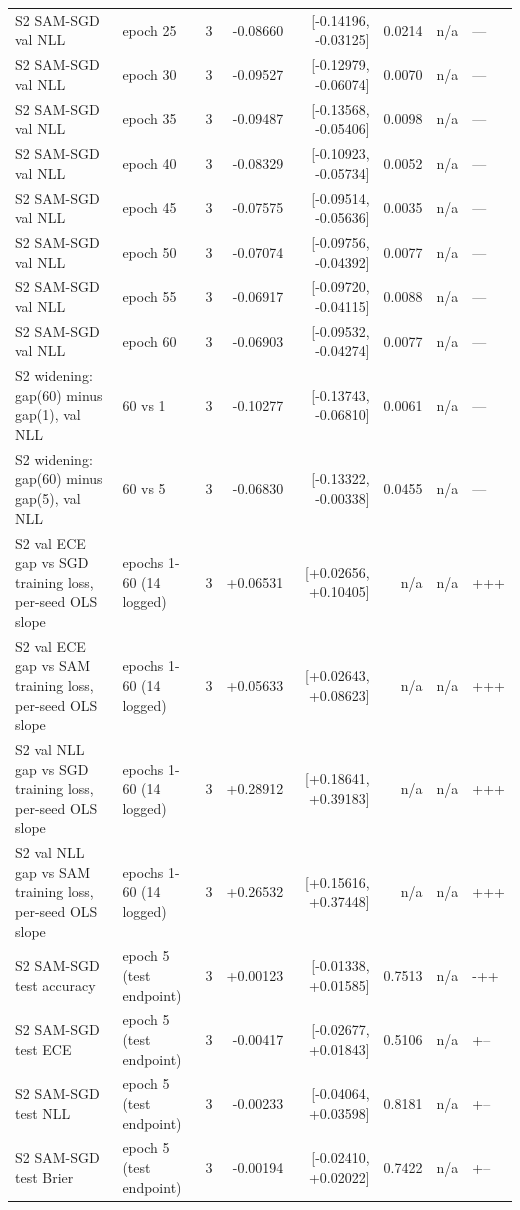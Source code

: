 \documentclass[11pt,letterpaper]{article}
\begin{document}
{\begin{longtable}{>{\raggedright\arraybackslash}p{3.6cm}lrrrrrl}
S2 SAM-SGD val NLL & epoch 25 & 3 & -0.08660 & [-0.14196, -0.03125] & 0.0214 & n/a & --- \\
S2 SAM-SGD val NLL & epoch 30 & 3 & -0.09527 & [-0.12979, -0.06074] & 0.0070 & n/a & --- \\
S2 SAM-SGD val NLL & epoch 35 & 3 & -0.09487 & [-0.13568, -0.05406] & 0.0098 & n/a & --- \\
S2 SAM-SGD val NLL & epoch 40 & 3 & -0.08329 & [-0.10923, -0.05734] & 0.0052 & n/a & --- \\
S2 SAM-SGD val NLL & epoch 45 & 3 & -0.07575 & [-0.09514, -0.05636] & 0.0035 & n/a & --- \\
S2 SAM-SGD val NLL & epoch 50 & 3 & -0.07074 & [-0.09756, -0.04392] & 0.0077 & n/a & --- \\
S2 SAM-SGD val NLL & epoch 55 & 3 & -0.06917 & [-0.09720, -0.04115] & 0.0088 & n/a & --- \\
S2 SAM-SGD val NLL & epoch 60 & 3 & -0.06903 & [-0.09532, -0.04274] & 0.0077 & n/a & --- \\
S2 widening: gap(60) minus gap(1), val NLL & 60 vs 1 & 3 & -0.10277 & [-0.13743, -0.06810] & 0.0061 & n/a & --- \\
S2 widening: gap(60) minus gap(5), val NLL & 60 vs 5 & 3 & -0.06830 & [-0.13322, -0.00338] & 0.0455 & n/a & --- \\
S2 val ECE gap vs SGD training loss, per-seed OLS slope & epochs 1-60 (14 logged) & 3 & +0.06531 & [+0.02656, +0.10405] & n/a & n/a & +++ \\
S2 val ECE gap vs SAM training loss, per-seed OLS slope & epochs 1-60 (14 logged) & 3 & +0.05633 & [+0.02643, +0.08623] & n/a & n/a & +++ \\
S2 val NLL gap vs SGD training loss, per-seed OLS slope & epochs 1-60 (14 logged) & 3 & +0.28912 & [+0.18641, +0.39183] & n/a & n/a & +++ \\
S2 val NLL gap vs SAM training loss, per-seed OLS slope & epochs 1-60 (14 logged) & 3 & +0.26532 & [+0.15616, +0.37448] & n/a & n/a & +++ \\
S2 SAM-SGD test accuracy & epoch 5 (test endpoint) & 3 & +0.00123 & [-0.01338, +0.01585] & 0.7513 & n/a & -++ \\
S2 SAM-SGD test ECE & epoch 5 (test endpoint) & 3 & -0.00417 & [-0.02677, +0.01843] & 0.5106 & n/a & +-- \\
S2 SAM-SGD test NLL & epoch 5 (test endpoint) & 3 & -0.00233 & [-0.04064, +0.03598] & 0.8181 & n/a & +-- \\
S2 SAM-SGD test Brier & epoch 5 (test endpoint) & 3 & -0.00194 & [-0.02410, +0.02022] & 0.7422 & n/a & +-- \\

\end{longtable}}
\end{document}
